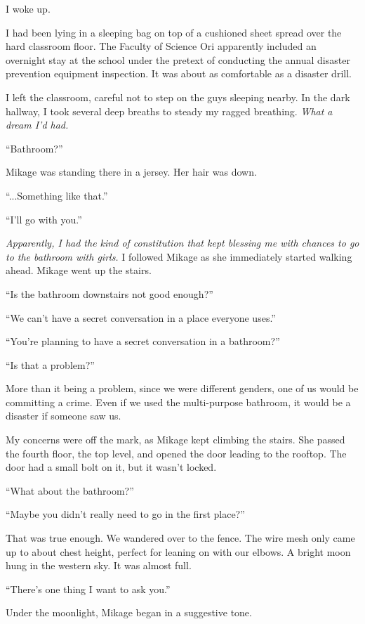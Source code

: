 \documentclass[
    a4paper,
    12pt,
    twoside,
    openany,
    UTF8,
    fontset=windows
]{ctexbook}
\begin{document}
I woke up.

I had been lying in a sleeping bag on top of a cushioned sheet spread over the hard classroom floor. The Faculty of Science Ori apparently included an overnight stay at the school under the pretext of conducting the annual disaster prevention equipment inspection. It was about as comfortable as a disaster drill.

I left the classroom, careful not to step on the guys sleeping nearby. In the dark hallway, I took several deep breaths to steady my ragged breathing. \textit{What a dream I'd had.}

``Bathroom?''

Mikage was standing there in a jersey. Her hair was down.

``...Something like that.''

``I'll go with you.''

\textit{Apparently, I had the kind of constitution that kept blessing me with chances to go to the bathroom with girls.} I followed Mikage as she immediately started walking ahead. Mikage went up the stairs.

``Is the bathroom downstairs not good enough?''

``We can't have a secret conversation in a place everyone uses.''

``You're planning to have a secret conversation in a bathroom?''

``Is that a problem?''

More than it being a problem, since we were different genders, one of us would be committing a crime. Even if we used the multi-purpose bathroom, it would be a disaster if someone saw us.

My concerns were off the mark, as Mikage kept climbing the stairs. She passed the fourth floor, the top level, and opened the door leading to the rooftop. The door had a small bolt on it, but it wasn't locked.

``What about the bathroom?''

``Maybe you didn't really need to go in the first place?''

That was true enough. We wandered over to the fence. The wire mesh only came up to about chest height, perfect for leaning on with our elbows. A bright moon hung in the western sky. It was almost full.

``There's one thing I want to ask you.''

Under the moonlight, Mikage began in a suggestive tone.
\end{document}

